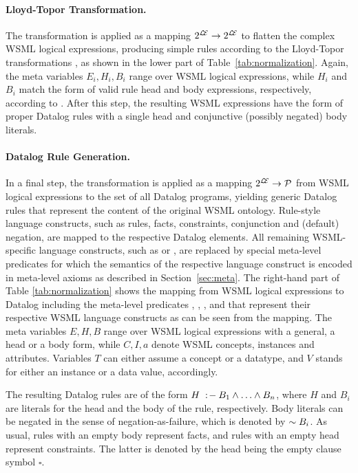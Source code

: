 \vspace{-2mm}
\paragraph{Lloyd-Topor Transformation.} The transformation
\translt is applied as a mapping $2^{\mathcal{L\!E}} \rightarrow
2^{\mathcal{L\!E}}$ to flatten the complex WSML logical expressions,
producing simple rules according to the Lloyd-Topor
transformations \cite{lloyd-topor}, as shown in the lower part of
Table~\ref{tab:normalization}. Again, the meta variables
$E_i,H_i,B_i$ range over WSML logical expressions, while $H_i$ and
$B_i$ match the form of valid rule head and body expressions,
respectively, according to \cite{wsml-spec}. After this step, the
resulting WSML expressions have the form of proper Datalog rules
with a single head and conjunctive (possibly negated) body
literals.

\vspace{-2mm}
\paragraph{Datalog Rule Generation.} In a final step, the
transformation \transdlog is applied as a mapping $2^{\mathcal{L\!E}}
\rightarrow \mathcal{P}$ from WSML logical expressions to the set of all
Datalog programs, yielding generic Datalog rules that represent
the content of the original WSML ontology. Rule-style language
constructs, such as rules, facts, constraints, conjunction and
(default) negation, are mapped to the respective Datalog elements.
All remaining WSML-specific language constructs, such as
 or , are replaced by special
meta-level predicates for which the semantics of the respective
language construct is encoded in meta-level axioms as described in
Section~\ref{sec:meta}. The right-hand part of Table
\ref{tab:normalization} shows the mapping from WSML logical
expressions to Datalog including the meta-level predicates \psco,
\pmo, \phval, \pitype and \potype that represent their respective
WSML language constructs as can be seen from the mapping. The meta
variables $E,H,B$ range over WSML logical expressions with a
general, a head or a body form, while $C,I,a$ denote WSML
concepts, instances and attributes. Variables $T$ can either
assume a concept or a datatype, and $V$ stands for either an
instance or a data value, accordingly.

The resulting Datalog rules are of the form $H \lprl B_1 \dlogand
\dots \dlogand B_n$, where $H$ and $B_i$ are literals for the head
and the body of the rule, respectively. Body literals can be
negated in the sense of negation-as-failure, which is denoted by
$\sim B_i$. As usual, rules with an empty body represent
facts, and rules with an empty head represent constraints. The
latter is denoted by the head being the empty clause symbol
$\square$.

